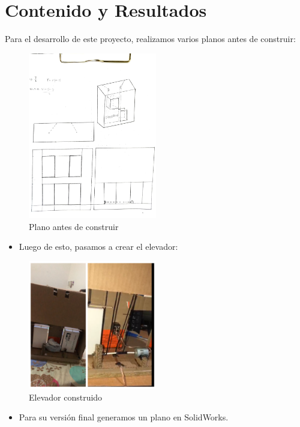 \documentclass{article}
\begin{document}
\section*{Contenido y Resultados}
Para el desarrollo de este proyecto, realizamos varios planos antes de construir:
\begin{figure}[H]
\centering
\includegraphics[width=0.5\textwidth]{Plano 1.jpeg}
\caption{Plano antes de construir}
\label{fig:imagen}
\end{figure}
\begin{itemize}
\item Luego de esto, pasamos a crear el elevador:
\end{itemize}
\begin{figure}[H]
\centering
\includegraphics[width=0.5\textwidth]{Picture1.png}
\caption{Elevador construido}
\label{fig:imagen1}
\end{figure}
\begin{itemize}
\item Para su versión final generamos un plano en SolidWorks.
\end{itemize}
\end{document}

